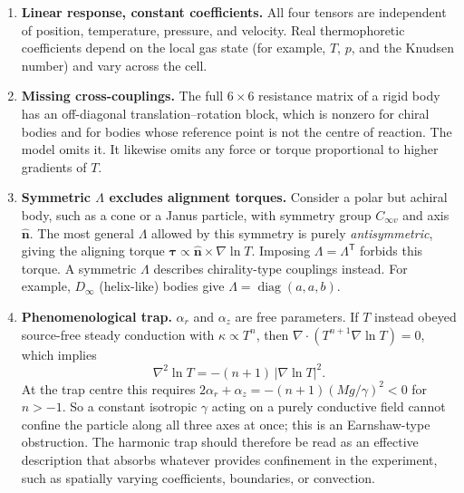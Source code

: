 \documentclass[11pt]{article}
\newcommand{\vect}[1]{\bm{#1}}
\newcommand{\tens}[1]{\mathsf{#1}}
\newcommand{\T}{^{\mathsf{T}}}
\theoremstyle{remark}
\begin{document}
\begin{enumerate}
  \item \textbf{Linear response, constant coefficients.} All four tensors
        are independent of position, temperature, pressure, and velocity.
        Real thermophoretic coefficients depend on the local gas state
        (for example, $T$, $p$, and the Knudsen number) and vary across
        the cell.

  \item \textbf{Missing cross-couplings.} The full $6\times6$ resistance
        matrix of a rigid body has an off-diagonal translation--rotation
        block, which is nonzero for chiral bodies and for bodies whose
        reference point is not the centre of reaction. The model omits it.
        It likewise omits any force or torque proportional to higher
        gradients of $T$.

  \item \textbf{Symmetric $\tens{\Lambda}$ excludes alignment torques.}
        Consider a polar but achiral body, such as a cone or a Janus
        particle, with symmetry group $C_{\infty v}$ and axis
        $\hat{\vect{n}}$. The most general $\tens{\Lambda}$ allowed by
        this symmetry is purely \emph{antisymmetric}, giving the aligning
        torque $\vect{\tau}\propto\hat{\vect{n}}\times\nabla\ln T$.
        Imposing $\tens{\Lambda}=\tens{\Lambda}\T$ forbids this torque. A
        symmetric $\tens{\Lambda}$ describes chirality-type couplings
        instead. For example, $D_\infty$ (helix-like) bodies give
        $\tens{\Lambda}=\operatorname{diag}(a,a,b)$.

  \item \textbf{Phenomenological trap.}
        \label{rem:gammaconstraint}
        $\alpha_r$ and $\alpha_z$ are free parameters. If $T$ instead
        obeyed source-free steady conduction with $\kappa\propto T^n$,
        then $\nabla\!\cdot(T^{n+1}\nabla\ln T)=0$, which implies
        \begin{equation}
          \nabla^2\ln T = -(n+1)\,|\nabla\ln T|^2 .
        \end{equation}
        At the trap centre this requires
        $2\alpha_r+\alpha_z=-(n+1)(Mg/\gamma)^2<0$ for $n>-1$. So a
        constant isotropic $\gamma$ acting on a purely conductive field
        cannot confine the particle along all three axes at once; this is
        an Earnshaw-type obstruction. The harmonic trap should therefore
        be read as an effective description that absorbs whatever
        provides confinement in the experiment, such as spatially varying
        coefficients, boundaries, or convection.


\end{enumerate}
\end{document}

